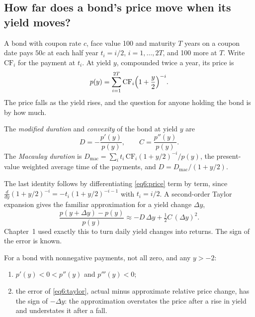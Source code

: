 \begin{chapterrefs}
\section{How far does a bond's price move when its yield moves?}
\label{sec6:duration}

A bond with coupon rate $c$, face value 100 and maturity $T$ years on a coupon date pays $50c$ at
each half year $t_i=i/2$, $i=1,\dots,2T$, and 100 more at $T$. Write $\mathrm{CF}_i$ for the payment at
$t_i$. At yield $y$, compounded twice a year, its price is
\begin{equation}\label{eq6:price}
  p(y)=\sum_{i=1}^{2T}\mathrm{CF}_i\Bigl(1+\frac y2\Bigr)^{-i}.
\end{equation}
The price falls as the yield rises, and the question for anyone holding the bond is by how much.

\begin{definition}\label{def6:duration}
The \emph{modified duration} and \emph{convexity} of the bond at yield $y$ are
\[
  D=-\frac{p'(y)}{p(y)},\qquad C=\frac{p''(y)}{p(y)} .
\]
The \emph{Macaulay duration} is $D_{\mathrm{mac}}=\sum_it_i\,\mathrm{CF}_i(1+y/2)^{-i}/p(y)$, the
present-value weighted average time of the payments, and $D=D_{\mathrm{mac}}/(1+y/2)$.
\end{definition}

The last identity follows by differentiating \cref{eq6:price} term by term, since
$\tfrac{d}{dy}(1+y/2)^{-i}=-t_i(1+y/2)^{-i-1}$ with $t_i=i/2$. A second-order Taylor expansion gives the
familiar approximation for a yield change $\Delta y$,
\begin{equation}\label{eq6:taylor}
  \frac{p(y+\Delta y)-p(y)}{p(y)}\approx-D\,\Delta y+\tfrac12C\,(\Delta y)^2 .
\end{equation}
Chapter~1 used exactly this to turn daily yield changes into returns. The sign of the error is
known.

\begin{proposition}\label{prop6:shape}
For a bond with nonnegative payments, not all zero, and any $y>-2$:
\begin{enumerate}[label=(\roman*)]
  \item $p'(y)<0<p''(y)$ and $p'''(y)<0$;
  \item the error of \cref{eq6:taylor}, actual minus approximate relative price change, has the sign of
  $-\Delta y$: the approximation overstates the price after a rise in yield and understates it after a
  fall.
\end{enumerate}
\end{proposition}


\end{chapterrefs}
